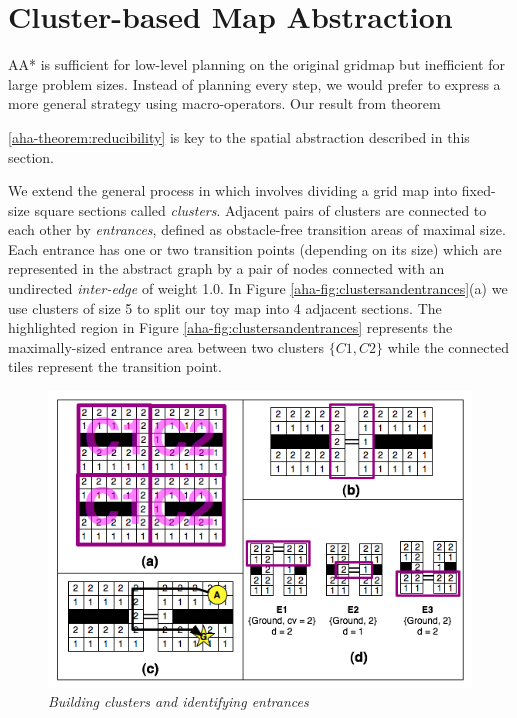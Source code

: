 \section{Cluster-based Map Abstraction}
\label{aha:mapabstraction}
AA* is sufficient for low-level planning on the original gridmap but inefficient for large problem sizes. 
Instead of planning every step, we would prefer to express a more general strategy using macro-operators.
Our result from theorem {\ref{aha-theorem:reducibility} is key to the spatial abstraction described in this section. 
\par \indent
We extend the general process in \cite{botea04} which involves dividing a grid map into fixed-size square sections called \emph{clusters}. 
Adjacent pairs of clusters are connected to each other by \emph{entrances}, defined as obstacle-free transition areas of maximal size. 
Each entrance has one or two transition points (depending on its size) which are represented in the abstract graph by a pair of nodes connected with an undirected \emph{inter-edge} of weight 1.0. 
In Figure \ref{aha-fig:clustersandentrances}(a) we use clusters of size 5 to split our toy map into 4 adjacent sections. 
The highlighted region in Figure \ref{aha-fig:clustersandentrances} represents the maximally-sized entrance area between two clusters $\lbrace C1, C2 \rbrace$ while the connected tiles represent the transition point.
\begin{figure}[htbp]
        \caption{\emph{Building clusters and identifying entrances} }
        \begin{center}
                        \includegraphics[scale=0.40]{diagrams/identifying_entrances.png}
        \end{center}

\end{figure}}
